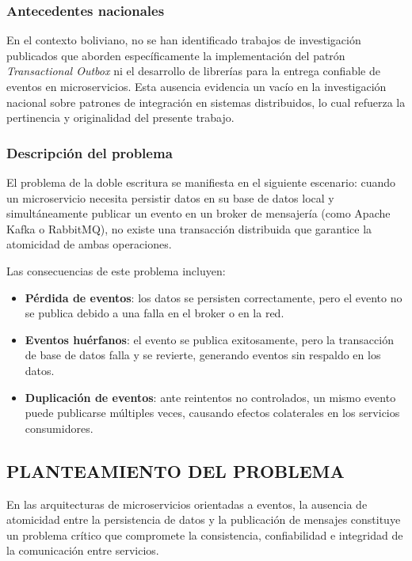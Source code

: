 \subsubsection{Antecedentes nacionales}

En el contexto boliviano, no se han identificado trabajos de investigación publicados que aborden específicamente la implementación del patrón \textit{Transactional Outbox} ni el desarrollo de librerías para la entrega confiable de eventos en microservicios. Esta ausencia evidencia un vacío en la investigación nacional sobre patrones de integración en sistemas distribuidos, lo cual refuerza la pertinencia y originalidad del presente trabajo.

\subsubsection{Descripción del problema}

El problema de la doble escritura se manifiesta en el siguiente escenario: cuando un microservicio necesita persistir datos en su base de datos local y simultáneamente publicar un evento en un broker de mensajería (como Apache Kafka o RabbitMQ), no existe una transacción distribuida que garantice la atomicidad de ambas operaciones.

Las consecuencias de este problema incluyen:

\begin{itemize}
    \item \textbf{Pérdida de eventos}: los datos se persisten correctamente, pero el evento no se publica debido a una falla en el broker o en la red.
    \item \textbf{Eventos huérfanos}: el evento se publica exitosamente, pero la transacción de base de datos falla y se revierte, generando eventos sin respaldo en los datos.
    \item \textbf{Duplicación de eventos}: ante reintentos no controlados, un mismo evento puede publicarse múltiples veces, causando efectos colaterales en los servicios consumidores.
\end{itemize}

\subsection{PLANTEAMIENTO DEL PROBLEMA}

En las arquitecturas de microservicios orientadas a eventos, la ausencia de atomicidad entre la persistencia de datos y la publicación de mensajes constituye un problema crítico que compromete la consistencia, confiabilidad e integridad de la comunicación entre servicios.

